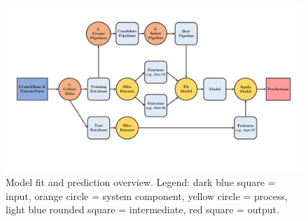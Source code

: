 \documentclass[../thesis/thesis.tex]{subfiles}
\begin{document}
\begin{figure}[!htb]
    \centering
    \includegraphics[width=\textwidth]{../figures/design/flowchart_make_predictions}
    \caption[Model fit and prediction flowchart]{Model fit and prediction overview. Legend: dark blue square = input, orange circle = system component, yellow circle = process, light blue rounded square = intermediate, red square = output.}
    \label{fig:design:make_predictions}
\end{figure}

\end{document}
